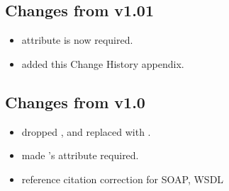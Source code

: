 \documentclass[11pt,a4paper]{ivoa}
\begin{document}
\subsection{Changes from v1.01}
\begin{itemize}
  \item {} attribute is now required.
  \item added this Change History appendix.
\end{itemize}

\subsection{Changes from v1.0}
\begin{itemize}
  \item dropped ,  and replaced
       with .
  \item made 's  attribute
       required.
  \item reference citation correction for SOAP, WSDL
\end{itemize}




\end{document}
